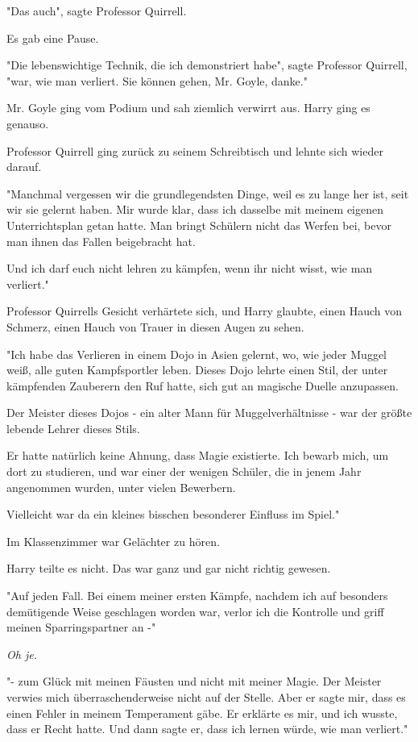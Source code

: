 {"Das auch", sagte Professor Quirrell.

Es gab eine Pause.

"Die lebenswichtige Technik, die ich demonstriert habe", sagte Professor Quirrell, "war, wie man verliert. Sie können gehen, Mr. Goyle, danke."

Mr. Goyle ging vom Podium und sah ziemlich verwirrt aus. Harry ging es genauso.

Professor Quirrell ging zurück zu seinem Schreibtisch und lehnte sich wieder darauf.

"Manchmal vergessen wir die grundlegendsten Dinge, weil es zu lange her ist, seit wir sie gelernt haben. Mir wurde klar, dass ich dasselbe mit meinem eigenen Unterrichtsplan getan hatte. Man bringt Schülern nicht das Werfen bei, bevor man ihnen das Fallen beigebracht hat.

Und ich darf euch nicht lehren zu kämpfen, wenn ihr nicht wisst, wie man verliert."

Professor Quirrells Gesicht verhärtete sich, und Harry glaubte, einen Hauch von Schmerz, einen Hauch von Trauer in diesen Augen zu sehen.

"Ich habe das Verlieren in einem Dojo in Asien gelernt, wo, wie jeder Muggel weiß, alle guten Kampfsportler leben. Dieses Dojo lehrte einen Stil, der unter kämpfenden Zauberern den Ruf hatte, sich gut an magische Duelle anzupassen.

Der Meister dieses Dojos - ein alter Mann für Muggelverhältnisse - war der größte lebende Lehrer dieses Stils.

Er hatte natürlich keine Ahnung, dass Magie existierte. Ich bewarb mich, um dort zu studieren, und war einer der wenigen Schüler, die in jenem Jahr angenommen wurden, unter vielen Bewerbern.

Vielleicht war da ein kleines bisschen besonderer Einfluss im Spiel."

Im Klassenzimmer war Gelächter zu hören.

Harry teilte es nicht. Das war ganz und gar nicht richtig gewesen.

"Auf jeden Fall. Bei einem meiner ersten Kämpfe, nachdem ich auf besonders demütigende Weise geschlagen worden war, verlor ich die Kontrolle und griff meinen Sparringspartner an -"

\emph{Oh je.}

"- zum Glück mit meinen Fäusten und nicht mit meiner Magie. Der Meister verwies mich überraschenderweise nicht auf der Stelle. Aber er sagte mir, dass es einen Fehler in meinem Temperament gäbe. Er erklärte es mir, und ich wusste, dass er Recht hatte. Und dann sagte er, dass ich lernen würde, wie man verliert."

}
